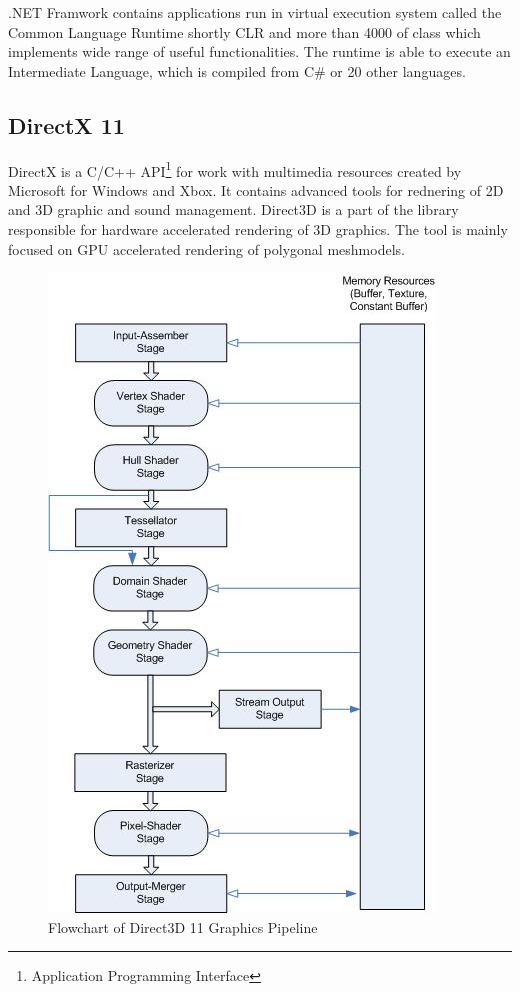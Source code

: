 \documentclass[twoside, english, 11pt]{report}
\begin{document}
.NET Framwork contains applications run in virtual execution system called the Common Language Runtime shortly CLR and more than 4000 of class which implements wide range of useful functionalities. The runtime is able to execute an Intermediate Language, which is compiled from C\# or 20 other languages.
\subsection{DirectX 11}

DirectX is a C/C++ API\footnote{Application Programming Interface} for work with multimedia resources created by Microsoft for Windows and Xbox. It contains advanced tools for rednering of 2D and 3D graphic and sound management. Direct3D is a part of the library responsible for hardware accelerated rendering of 3D graphics. The tool is mainly focused on GPU accelerated rendering of polygonal meshmodels.\\
 \begin{figure}[H]
\centerline{\includegraphics[scale=0.9]{img/pipeline}}
\caption{Flowchart of Direct3D 11 Graphics Pipeline\label{fig:pipeline}}
\end{figure}
\end{document}
